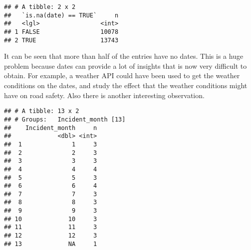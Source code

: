 \documentclass[
]{book}
\newenvironment{Shaded}{\begin{snugshade}}{\end{snugshade}}
\newcommand{\DataTypeTok}[1]{\textcolor[rgb]{0.13,0.29,0.53}{#1}}
\newcommand{\KeywordTok}[1]{\textcolor[rgb]{0.13,0.29,0.53}{\textbf{#1}}}
\newcommand{\NormalTok}[1]{#1}
\newcommand{\OperatorTok}[1]{\textcolor[rgb]{0.81,0.36,0.00}{\textbf{#1}}}
\newcommand{\OtherTok}[1]{\textcolor[rgb]{0.56,0.35,0.01}{#1}}
\newcommand{\StringTok}[1]{\textcolor[rgb]{0.31,0.60,0.02}{#1}}
\begin{document}
\begin{Shaded}
\end{Shaded}

\begin{verbatim}
## # A tibble: 2 x 2
##   `is.na(date) == TRUE`     n
##   <lgl>                 <int>
## 1 FALSE                 10078
## 2 TRUE                  13743
\end{verbatim}

It can be seen that more than half of the entries have no dates. This is a huge problem because dates can provide a lot of insights that is now very difficult to obtain. For example, a weather API could have been used to get the weather conditions on the dates, and study the effect that the weather conditions might have on road safety. Also there is another interesting observation.

\begin{Shaded}
\end{Shaded}

\begin{verbatim}
## # A tibble: 13 x 2
## # Groups:   Incident_month [13]
##    Incident_month     n
##             <dbl> <int>
##  1              1     3
##  2              2     3
##  3              3     3
##  4              4     4
##  5              5     3
##  6              6     4
##  7              7     3
##  8              8     3
##  9              9     3
## 10             10     3
## 11             11     3
## 12             12     3
## 13             NA     1
\end{verbatim}
\end{document}
